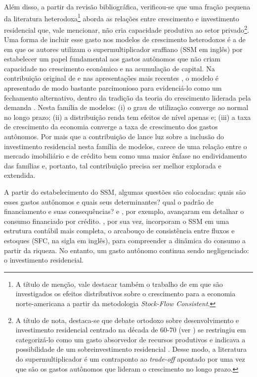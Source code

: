 Além disso, a partir da revisão bibliográfica, verificou-se que uma fração pequena da literatura heterodoxa\footnote{
	A título de menção, vale destacar também o trabalho de \textcite{zezza_u.s._2008} em que são investigados os efeitos distributivos sobre o crescimento para a economia norte-americana a partir da metodologia \textit{Stock-Flow Consistent}.}
aborda as relações entre crescimento e investimento residencial que, vale mencionar, não cria capacidade produtiva ao setor privado\footnote{A título de nota, destaca-se que debate ortodoxo sobre desenvolvimento e investimento residencial centrado na década de 60-70 (ver \textcite{arku_housing_2006}) se restringiu em categorizá-lo como um gasto absorvedor de recursos produtivos \cite{solow_importance_1995} e indicava  a possibilidade de um sobreinvestimento residencial \cite{mills_has_1987}. Desse modo, a literatura do supermultiplicador é um contraponto ao \textit{trade-off} apontado por \textcite{solow_importance_1995} uma vez que são os gastos autônomos que lideram o crescimento no longo prazo. 
}. Uma forma de incluir esse gasto nos modelos de crescimento heterodoxos é a de \textcite{da_silveira_investimento_2019} em que os autores utilizam o supermultiplicador sraffiano (SSM em inglês) por estabelecer um papel fundamental aos gastos autônomos que não criam capacidade no crescimento econômico e na acumulação de capital. Na contribuição original de \textcite{serrano_sraffian_1995} e nas apresentações mais recentes \cite{freitas_growth_2015}, o modelo é apresentado de modo bastante parcimonioso para evidenciá-lo como um fechamento alternativo, dentro da tradição da teoria do crescimento liderada pela demanda \cite{serrano_sraffian_2017}. Nesta família de modelos: (i) o grau de utilização converge ao normal no longo prazo; (ii) a distribuição renda tem efeitos de nível apenas e; (iii) a taxa de crescimento da economia converge a taxa de crescimento dos gastos autônomos. Por mais que a contribuição de \textcite{da_silveira_investimento_2019} lance luz sobre a inclusão do investimento residencial nesta família de modelos, carece de uma relação entre o mercado imobiliário e de crédito bem como uma maior ênfase no endividamento das famílias e, portanto, tal contribuição precisa ser melhor explorada e extendida.

A partir do estabelecimento do SSM, algumas questões são colocadas: quais são esses gastos autônomos e quais seus determinantes? qual o padrão de financiamento e suas consequências? \textcite{pariboni_household_2016} e \textcite{fagundes_role_2017}, por exemplo, avançaram em detalhar o consumo financiado por crédito.  \textcite{brochier_supermultiplier_2018}, por sua vez, incorporam o SSM em uma estrutura contábil mais completa, o arcabouço de consistência entre fluxos e estoques (SFC, na sigla em inglês), para compreender a dinâmica do consumo a partir da riqueza. No entanto, um gasto autônomo continua sendo negligenciado: o investimento residencial. 

